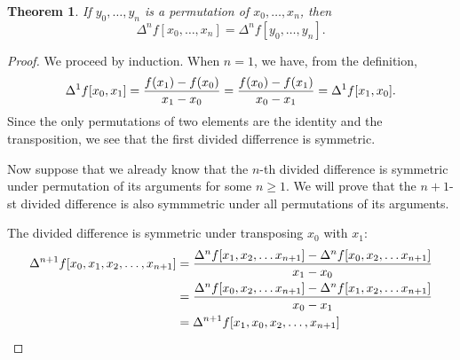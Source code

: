 \documentclass[12pt]{article}
\newtheorem{thm}{Theorem}
\begin{document}
\begin{thm}
If $y_0, \ldots, y_n$ is a permutation of $x_0, \ldots, x_n$, then
\[
\Delta^n f [x_0, \ldots, x_n] = \Delta^n f [y_0, \ldots, y_n].
\]
\end{thm}

\begin{proof}
We proceed by induction.  When $n=1$, we have, from the definition,
\[
\Delta^1 f [x_0, x_1] =
{f(x_1) - f(x_0) \over x_1 - x_0} =
{f(x_0) - f(x_1) \over x_0 - x_1} =
\Delta^1 f [x_1, x_0].
\]
Since the only permutations of two elements are the identity and the
transposition, we see that the first divided differrence is symmetric.

Now suppose that we already know that the $n$-th divided difference
is symmetric under permutation of its arguments for some $n \ge 1$.
We will prove that the $n+1$-st divided difference is also symmmetric
under all permutations of its arguments.

The divided difference is symmetric under transposing $x_0$ with
$x_1$:
\begin{align*}
\Delta^{n+1} f [x_0, x_1, x_2, \ldots, x_{n+1}] &=
{\Delta^n f [x_1, x_2, \ldots x_{n+1}] -
 \Delta^n f [x_0, x_2, \ldots x_{n+1}]
 \over x_1 - x_0} \\ &=
{\Delta^n f [x_0, x_2, \ldots x_{n+1}] -
 \Delta^n f [x_1, x_2, \ldots x_{n+1}]
 \over x_0 - x_1} \\ &=
\Delta^{n+1} f [x_1, x_0, x_2, \ldots, x_{n+1}]
\end{align*}


\end{proof}
\end{document}

